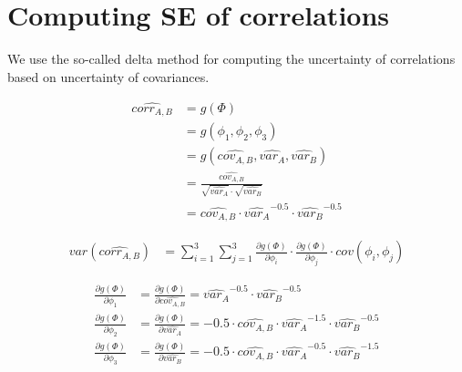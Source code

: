 


\section{Computing SE of correlations}
We use the so-called delta method for computing the uncertainty of correlations based on uncertainty of covariances.

\[
\begin{split}
\hat{corr_{A,B}}&=g(\Phi)\\
&=g\left(\phi_1,\phi_2,\phi_3\right)\\
&=g\left(\hat{cov_{A,B}},\hat{var_{A}},\hat{var_{B}}\right)\\
&=\frac{\hat{cov_{A,B}}}{\sqrt{\hat{var_{A}}}\cdot \sqrt{\hat{var_{B}}}}\\
&=\hat{cov_{A,B}}\cdot \hat{var_{A}}^{-0.5} \cdot \hat{var_{B}}^{-0.5}
\end{split}
\]

\[
\begin{split}
var\left(\hat{corr_{A,B}}\right)&=\sum_{i=1}^{3}\sum_{j=1}^{3} \frac{\partial g(\Phi)}{\partial \phi_{i}} \cdot \frac{\partial g(\Phi)}{\partial \phi_{j}}\cdot cov\left(\phi_{i},\phi_{j} \right)
\end{split}
\]

\[
\begin{split}
\frac{\partial g(\Phi)}{\partial \phi_1}&=\frac{\partial g(\Phi)}{\partial \hat{cov_{A,B}}} =\hat{var_{A}}^{-0.5} \cdot \hat{var_{B}}^{-0.5}\\
\frac{\partial g(\Phi)}{\partial \phi_2}&=\frac{\partial g(\Phi)}{\partial \hat{var_{A}}} = -0.5 \cdot \hat{cov_{A,B}}\cdot \hat{var_{A}}^{-1.5} \cdot \hat{var_{B}}^{-0.5}\\
\frac{\partial g(\Phi)}{\partial \phi_3}&=\frac{\partial g(\Phi)}{\partial \hat{var_{B}}} = -0.5 \cdot \hat{cov_{A,B}}\cdot \hat{var_{A}}^{-0.5} \cdot \hat{var_{B}}^{-1.5}
\end{split}
\]

